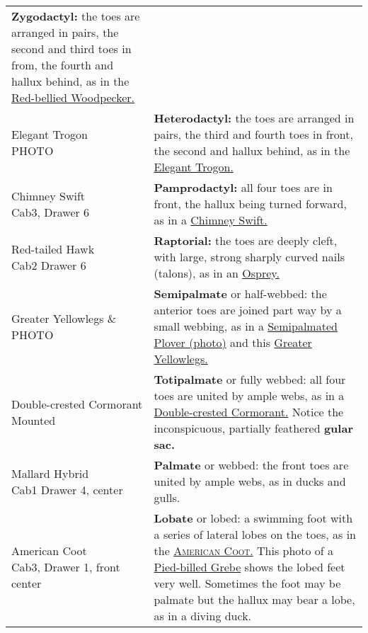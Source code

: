 \documentclass[10pt]{article}
\newif\ifprintkey
\newcommand{\PrintKey}[1]{\ifprintkey{\textbf{#1}}\fi}
\begin{document}
\begin{longtable}{@{}C{0.45\textwidth}L{0.45\textwidth}@{}}
\textbf{Zygodactyl:} the toes are arranged in pairs, the second and third toes in from, the fourth and hallux behind, as in the \href{https://www.allaboutbirds.org/guide/Red-bellied_Woodpecker/}{Red-bellied Woodpecker.} \\ [2.5cm]
%
\PrintKey{Elegant Trogon \newline PHOTO} & 
\textbf{Heterodactyl:} the toes are arranged in pairs, the third and fourth toes in front, the second and hallux behind, as in the \href{https://www.allaboutbirds.org/guide/Elegant_Trogon}{Elegant Trogon.} \\ [2.5cm]
%
\PrintKey{Chimney Swift \newline Cab3, Drawer 6} & 
\textbf{Pamprodactyl:} all four toes are in front, the hallux being turned forward, as in a \href{https://www.allaboutbirds.org/guide/Chimney_Swift}{Chimney Swift.}\\ [2.5cm]
%
\PrintKey{Red-tailed Hawk \newline Cab2 Drawer 6} & 
\textbf{Raptorial:} the toes are deeply cleft, with large, strong sharply curved nails (talons), as in an \href{https://www.allaboutbirds.org/guide/Osprey}{Osprey.} \\ [2.5cm]
%
\PrintKey{Greater Yellowlegs \& \newline PHOTO} & 
\textbf{Semipalmate} or half-webbed: the anterior toes are joined part way by a small webbing, as in a \href{https://www.allaboutbirds.org/guide/Semipalmated_Plover}{Semipalmated Plover (photo)} and this \href{https://www.allaboutbirds.org/guide/Greater_Yellowlegs}{Greater Yellowlegs.} \\ [2.5cm]
%
\PrintKey{Double-crested Cormorant \newline Mounted} & 
\textbf{Totipalmate} or fully webbed: all four toes are united by ample webs, as in a \href{https://www.allaboutbirds.org/guide/Double-crested_Cormorant}{Double-crested Cormorant.} Notice the inconspicuous, partially feathered \textbf{gular sac.} \\ [2.5cm]
%
\PrintKey{Mallard Hybrid \newline Cab1 Drawer 4, center} & 
\textbf{Palmate} or webbed: the front toes are united by ample webs, as in ducks and gulls. \\ [2.5cm]
%
\PrintKey{American Coot \newline Cab3, Drawer 1, front center} & 
\textbf{Lobate} or lobed: a swimming foot with a series of lateral lobes on the toes, as in the \href{https://www.allaboutbirds.org/guide/American_Coot}{\textsc{American Coot.}} This photo of a \href{https://www.allaboutbirds.org/guide/Pied-billed_Grebe/media-browser/63919971}{Pied-billed Grebe} shows the lobed feet very well. Sometimes the foot may be palmate but the hallux may bear a lobe, as in a diving duck. \\ [2.5cm]
%

\bottomrule
\end{longtable}
\end{document}
